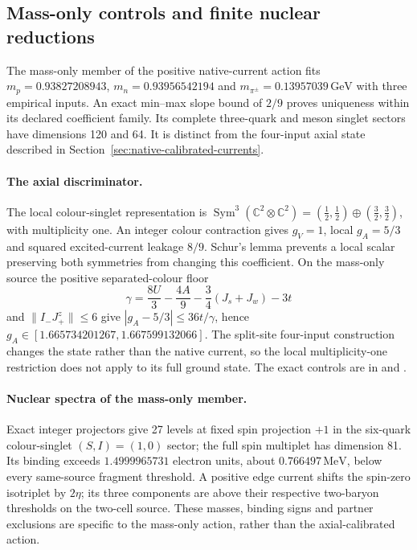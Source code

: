 
\subsection{Mass-only controls and finite nuclear reductions}

The mass-only member of the positive native-current action fits
$m_p=0.93827208943$, $m_n=0.93956542194$ and
$m_{\pi^\pm}=0.13957039\,\mathrm{GeV}$ with three empirical inputs.
An exact min--max slope bound of $2/9$ proves uniqueness within its
declared coefficient family. Its complete three-quark and meson singlet
sectors have dimensions 120 and 64. It is distinct from the four-input
axial state described in Section~\ref{sec:native-calibrated-currents}.

\paragraph{The axial discriminator.}
The local colour-singlet representation is
$\operatorname{Sym}^3(\mathbb C^2\otimes\mathbb C^2)
=(\tfrac12,\tfrac12)\oplus(\tfrac32,\tfrac32)$, with multiplicity one.
An integer colour contraction gives $g_V=1$, local $g_A=5/3$ and squared
excited-current leakage $8/9$. Schur's lemma prevents a local scalar
preserving both symmetries from changing this coefficient. On the
mass-only source the positive separated-colour floor
\[
 \gamma=\frac{8U}{3}-\frac{4A}{9}
       -\frac34(J_s+J_w)-3t
\]
and $\|I_-J_+^z\|\leq6$ give
$|g_A-5/3|\leq36t/\gamma$, hence
$g_A\in[1.665734201267,1.667599132066]$.
The split-site four-input construction changes the state rather than the
native current, so the local multiplicity-one restriction does not apply
to its full ground state. The exact controls are in
 and
.

\paragraph{Nuclear spectra of the mass-only member.}
Exact integer projectors give 27 levels at fixed spin projection $+1$
in the six-quark colour-singlet $(S,I)=(1,0)$ sector; the full spin
multiplet has dimension 81. Its binding exceeds
$1.4999965731$ electron units, about $0.766497\,\mathrm{MeV}$,
below every same-source fragment threshold. A positive edge current
shifts the spin-zero isotriplet by $2\eta$; its three components are
above their respective two-baryon thresholds on the two-cell source.
These masses, binding signs and partner exclusions are specific
to the mass-only action, rather than the axial-calibrated action.


